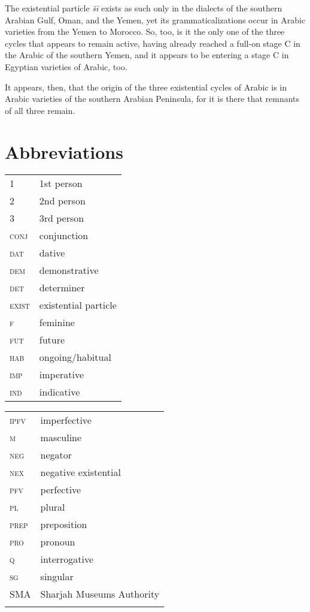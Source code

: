 \documentclass[output=paper]{langsci/langscibook}
\begin{document}
The existential particle \textit{šī} exists as such only in the dialects of the southern Arabian Gulf, Oman, and the Yemen, yet its grammaticalizations occur in Arabic varieties from the Yemen to Morocco. So, too, is it the only one of the three cycles that appears to remain active, having already reached a full-on stage C in the Arabic of the southern Yemen, and it appears to be entering a stage C in Egyptian varieties of Arabic, too.

It appears, then, that the origin of the three existential cycles of Arabic is in Arabic varieties of the southern Arabian Peninsula, for it is there that remnants of all three remain.

\section*{Abbreviations}
\begin{tabularx}{.45\textwidth}{lQ}
    1 & 1st person \\
    2 & 2nd person \\
    3 & 3rd person \\
    \textsc{conj} & conjunction \\
    \textsc{dat} & dative \\
    \textsc{dem}& demonstrative \\
    \textsc{det} & determiner \\
    \textsc{exist} & existential particle \\
    \textsc{f} & feminine \\
    \textsc{fut} & future \\
    \textsc{hab} & ongoing/habitual \\
    \textsc{imp} & imperative \\
    \textsc{ind} & indicative \\
\end{tabularx}
\begin{tabularx}{.45\textwidth}{lQ}
    \textsc{ipfv} & imperfective \\
    \textsc{m} & masculine \\
    \textsc{neg} & negator \\
    \textsc{nex} & negative existential \\
    \textsc{pfv} & perfective \\
    \textsc{pl} & plural \\
    \textsc{prep} & preposition \\
    \textsc{pro} & pronoun \\
    \textsc{q} & interrogative \\
    \textsc{sg} & singular \\
    SMA & Sharjah Museums Authority \\
    \\
\end{tabularx}
\end{document}
